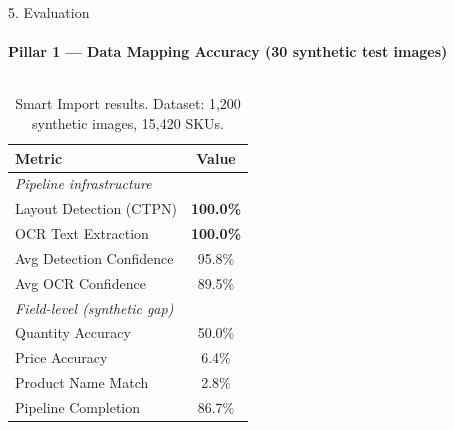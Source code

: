 \documentclass[10pt,aspectratio=169]{beamer}
\begin{document}
\begin{frame}{5. Evaluation}
  \framesubtitle{Pillar 1 --- Data Mapping Accuracy (30 synthetic test images)}

  \begin{columns}[t]
    \begin{table}
      \centering\scriptsize
      \begin{tabular}{lc}
        \toprule
        \textbf{Metric} & \textbf{Value} \\
        \midrule
        \multicolumn{2}{l}{\emph{Pipeline infrastructure}} \\
        Layout Detection (CTPN)  & \textbf{100.0\%} \\
        OCR Text Extraction      & \textbf{100.0\%} \\
        Avg Detection Confidence & 95.8\% \\
        Avg OCR Confidence       & 89.5\% \\
        \midrule
        \multicolumn{2}{l}{\emph{Field-level (synthetic gap)}} \\
        Quantity Accuracy         & 50.0\% \\
        Price Accuracy            & 6.4\% \\
        Product Name Match        & 2.8\% \\
        Pipeline Completion       & 86.7\% \\
        \bottomrule
      \end{tabular}
      \caption{Smart Import results. \newline
      Dataset: 1,200 synthetic images, 15,420 SKUs.}
    \end{table}


\end{columns}
\end{frame}
\end{document}
